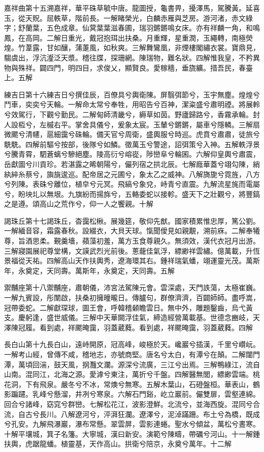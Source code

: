 \begin{pinyinscope}
嘉祥曲第十五溯嘉祥，華平硃草毓中唐。龍圖授，龜書畀，擾澤馬，駕騰黃。延喜玉，從天貺。屈軼草，階前長。一解睹榮光，白麟赤雁與芝房。游河渚，赤文綠字；舒蘭葉，五色成章。仙蓂葉葉滋春圃，瑞羽鏘鏘鳴女床。亦有祥麟一角，和鳴鳳，在高岡。二解日重光，戴冠抱珥出扶桑。月重輝，星重潤，玉繩轉，南極熒煌。竹葦露，甘如釀，蒲萐風，如秋爽。三解舞鸞凰，非煙樓閣繡衣裳。寶鼎見，騶虞出，浮沆瀣泛天漿。稽往牒，探珊網。陳瑞物，難名狀。四解惟我皇，不矜異物與殊祥。闢四門，明四目，求俊乂，顯賢良。愛稼穡，垂旒纊。措吾民，春臺上。五解

練吉日第十六練吉日兮撰佳辰，百僚具兮輿衛陳。屏翳弭節兮，玉宇無塵。煌煌兮鬥車，奕奕兮天輪。一解命太常兮奉牲，用昭告兮百神，潔粢盛兮肅明禋。將展軨兮效駕行，下觀兮勤民。二解甸師清畿兮，縟草如茵。野廬歸路兮，香霧承輪。封人設枑兮，左槭右平。掌舍具儀兮，爰象太宸。玉輦兮鏘鏘，屬車兮隱轔。三解扇微颸兮清幰，扈細靄兮硃輪。備天官兮周衛，盛輿服兮時巡。虎賁兮肅肅，徒旅兮駪駪。四解前驅兮按部，後隊兮如鱗。徵萬玉兮警途，詔弭策兮入神。五解軼浮景兮騰青霄，駟蒼螭兮驂絕塵。陵高衍兮嵱嵸，陟巒阜兮輪囷。六解仰皇輿兮肅震，岳獻圖兮川貢珍。若湛露之晞朝陽兮，儼列宿之拱北辰。七解廕華蓋兮翊勾陳，綃紈綷糸蔡兮，旟旐逡巡。配帝居之元圃兮，象太乙之威神。八解旖旎兮霓旌，八方兮列陳。表硃兮離位，植皁兮元冥。飛縞兮象兌，峙青兮直震。九解流星旄而電屬兮，盼坱圠以無垠。九旗紛而揚旆兮，五輅委蛇以接軫。盛天下之壯觀兮，將豐鎬之是遵。頌高山之荒作兮，仰一人之饗親。十解

謁珠丘第十七謁珠丘，杳靄松楸。展幾筵，敬仰先猷。國家積累惟忠厚，篤公劉。一解緬音容，霜露春秋。設綴衣，大貝天球。愾聞僾見如親覯，溯前庥。二解奉犧尊，旨酒思柔。覲羹墻，蘋藻初羞，萬方玉食尊親久。無須效，漢代衣冠月出游。三解寢園展祀尊堂構，文謨武烈光前後。蔥蘢佳氣浮，縹緲祥雲繡。億萬載，升恆景福從天祐。四解高山天作扶輿秀，遼海環其右。鍾祥瑞氣蟠，翊運靈光茂。萬斯年，永奠定，天同壽。萬斯年，永奠定，天同壽。五解

禦黼座第十八禦黼座，肅朝儀，沛宮法駕陳元會。雲深處，天門詄蕩，太極崔巍。一解九賓設，彤闈啟，扶桑初擁曈曨日。傳臚句，群僚濟濟，百闢師師。盡呼嵩，冠帶委蛇。二解獻琛球，圖王會，呼韓稽顙瞻雲日。無中外，雕題鑿齒，烏弋黃支。慶躬逢，盛世威儀。三解中天華闕浮佳氣，締造經營萬載基。世德念豳岐，天澤陳冠履。看到處，祥颸晻靄，羽蓋葳蕤。看到處，祥颸晻靄，羽蓋葳蕤。四解

長白山第十九長白山，遠峙開原，冠高峰，峻極於天。巉巖兮插漢，千里兮巑岏。一解考山經，曾傳不咸，稽地志，亦號商堅。唐名兮太白，有潭兮在顛。二解闥門潭，萬頃回湍，鼓天風，㧏灩文瀾。源深兮流廣，三江兮出焉。三解鴨綠江，流自山南。混同江，北海之源。愛滹兮東注，萬折兮千盤。四解醫無閭，縹緲雲端。桃花洞，下有飛泉。嚴冬兮不冰，常燠兮無寒。五解木葉山，石磴盤桓。華表山，鶴影蹁躚。乳峰兮懸溜，井冽兮寒泉。六解石門谿，屹立巖前。儼雙扉，雲壑連綿。回合兮諸峰，窈窕兮群巒。七解松花江，波影澄鮮。北流兮，並海西旋。混同兮合流，自古兮長川。八解遼河兮，泙湃狂瀾。遼澤兮，泥淖蹣跚。布土兮為橋，既成兮孔安。九解飛瀑巖，瀑布常懸。翠雲屏，雲影連蜷。聖水兮傾盆，萬松兮晝寒。十解平壤城，箕子名籓。大寧城，漢曰新安。演範兮陳疇，帶礪兮河山。十一解鍾扶輿，虎踞龍蟠。植靈基，天作高山。拱衛兮陪京，永奠兮萬年。十二解


\end{pinyinscope}

